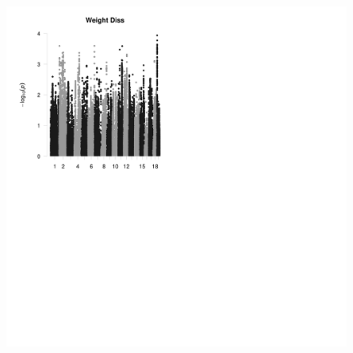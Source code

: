 \documentclass{article}
\begin{document}
\begin{figure}
\begin{center}
\includegraphics[width=15cm, height=15cm]{45.jpeg}
\end{center}
\end{figure}
\end{document}
